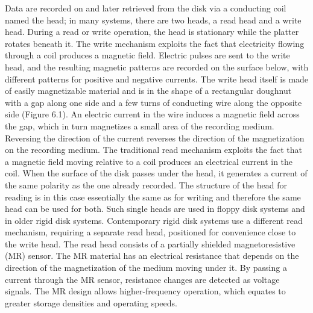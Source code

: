 Data are recorded on and later retrieved from the disk via a conducting coil named
the head; in many systems, there are two heads, a read head and a write head. During
a read or write operation, the head is stationary while the platter rotates beneath it.
The write mechanism exploits the fact that electricity flowing through a coil
produces a magnetic field. Electric pulses are sent to the write head, and the resulting
magnetic patterns are recorded on the surface below, with different patterns for
positive and negative currents. The write head itself is made of easily magnetizable
material and is in the shape of a rectangular doughnut with a gap along one side and
a few turns of conducting wire along the opposite side (Figure 6.1). An electric current
in the wire induces a magnetic field across the gap, which in turn magnetizes a
small area of the recording medium. Reversing the direction of the current reverses
the direction of the magnetization on the recording medium.
The traditional read mechanism exploits the fact that a magnetic field moving
relative to a coil produces an electrical current in the coil. When the surface of the
disk passes under the head, it generates a current of the same polarity as the one
already recorded. The structure of the head for reading is in this case essentially
the same as for writing and therefore the same head can be used for both. Such
single heads are used in floppy disk systems and in older rigid disk systems.
Contemporary rigid disk systems use a different read mechanism, requiring
a separate read head, positioned for convenience close to the write head. The read
head consists of a partially shielded magnetoresistive (MR) sensor. The MR material
has an electrical resistance that depends on the direction of the magnetization of
the medium moving under it. By passing a current through the MR sensor, resistance
changes are detected as voltage signals. The MR design allows higher-frequency
operation, which equates to greater storage densities and operating speeds.

